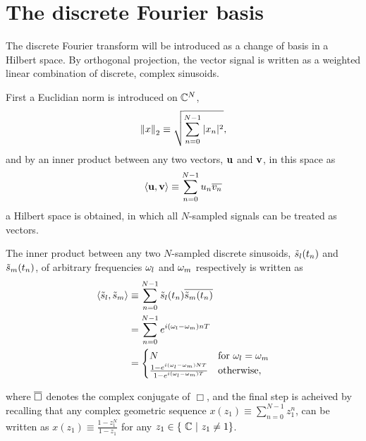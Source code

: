 
\section{The discrete Fourier basis}
The discrete Fourier transform will be introduced as a change of basis in a Hilbert space. By orthogonal projection, the vector signal is written as a weighted linear combination of discrete, complex sinusoids.

First a Euclidian norm is introduced on $\mathbb{C}^N$,
$$
\left\lVert x\right\rVert_{2} \equiv \sqrt{\sum_{n=0}^{N-1} |x_n|^2}
,
$$
and by an inner product between any two vectors, $\mathbf{u}$ and $\mathbf{v}$, in this space as
$$
\left< \mathbf{u}, \mathbf{v} \right>
\equiv \sum_{n=0}^{N-1} u_{n} \overline{v_{n}}
$$
a Hilbert space is obtained, in which all $N$-sampled signals can be treated as vectors.

The inner product between any two $N$-sampled discrete sinusoids, $\tilde{s}_{l}(t_n)$ and $\tilde{s}_{m}(t_n)$, of arbitrary frequencies $\omega_{l}$ and $\omega_{m}$ respectively is written as
\begin{align}
  \left< \tilde{s}_{l}, \tilde{s}_{m} \right>
  &\equiv \sum_{n=0}^{N-1} \tilde{s}_{l}(t_n) \overline{\tilde{s}_{m}(t_n)} \\
  &= \sum_{n=0}^{N-1} e^{i ( \omega_{l} - \omega_{m}) n T } \\
  &= \begin{cases}
    N & \textrm{for}\ \omega_{l} = \omega_{m} \\
    \frac{ 1 - e^{i ( \omega_{l} - \omega_{m}) N T} }{ 1 - e^{i ( \omega_{l} - \omega_{m}) T} } & \textrm{otherwise}
,
    \end{cases}
\label{eq:inner-product-general}
\end{align}

where $\overline{\Box}$ denotes the complex conjugate of $\Box$, and the final step is acheived by recalling that any complex geometric sequence $x(z_1) \equiv \sum_{n=0}^{N - 1} z_1^n$, can be written as $x(z_1)
\equiv \frac{1-z_1^N}{1-z_1}$ for any $z_1 \in \{\ \mathbb{C}\ |\ z_1 \ne 1
\}$.

